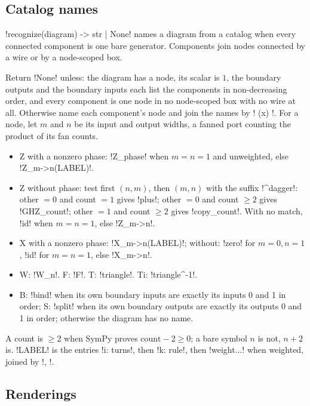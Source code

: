 \subsection{Catalog names}\label{sec:language-catalog}

\py!recognize(diagram) -> str | None! names a diagram from a catalog when every connected component is one bare generator. Components join nodes connected by a wire or by a node-scoped box.

\begin{algorithm}\label{alg:language-recognize}
\leavevmode
Return \py!None! unless: the diagram has a node, its scalar is $1$, the boundary outputs and the boundary inputs each list the components in non-decreasing order, and every component is one node in no node-scoped box with no wire at all. Otherwise name each component's node and join the names by \code! (x) !. For a node, let $m$ and $n$ be its input and output widths, a fanned port counting the product of its fan counts.
\begin{itemize}
\item Z with a nonzero phase: \code!Z_phase! when $m=n=1$ and unweighted, else \code!Z_{m->n}(LABEL)!.
\item Z without phase: test first $(n,m)$, then $(m,n)$ with the suffix \code!^dagger!: other $=0$ and count $=1$ gives \code!plus!; other $=0$ and count $\ge2$ gives \code!GHZ_{count}!; other $=1$ and count $\ge2$ gives \code!copy_{count}!. With no match, \code!id! when $m=n=1$, else \code!Z_{m->n}!.
\item X with a nonzero phase: \code!X_{m->n}(LABEL)!; without: \code!zero! for $m=0,n=1$, \code!id! for $m=n=1$, else \code!X_{m->n}!.
\item W: \code!W_{n}!. F: \code!F!. T: \code!triangle!. Ti: \code!triangle^-1!.
\item B: \code!bind! when its own boundary inputs are exactly its inputs 0 and 1 in order; S: \code!split! when its own boundary outputs are exactly its outputs 0 and 1 in order; otherwise the diagram has no name.
\end{itemize}
A count is $\ge2$ when SymPy proves $\text{count}-2\ge0$; a bare symbol $n$ is not, $n+2$ is. \code!LABEL! is the entries \code!i: turns!, then \code!k: rule!, then \code!weight{...}! when weighted, joined by \code!, !.
\end{algorithm}

\subsection{Renderings}

